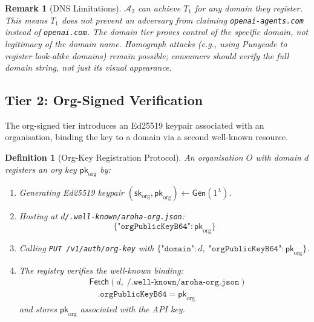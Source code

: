 \documentclass[conference]{IEEEtran}
\newtheorem{definition}{Definition}
\newtheorem{remark}{Remark}
\newcommand{\Adv}{\mathcal{A}}
\newcommand{\pk}{\mathsf{pk}}
\newcommand{\sk}{\mathsf{sk}}
\newcommand{\Gen}{\mathsf{Gen}}
\newcommand{\Fetch}{\mathsf{Fetch}}
\begin{document}
\begin{remark}[DNS Limitations]
$\Adv_2$ can achieve $T_1$ for any domain they register.
This means $T_1$ does not prevent an adversary from
claiming \texttt{openai-agents.com} instead of
\texttt{openai.com}. The domain tier proves control of the
specific domain, not legitimacy of the domain name.
Homograph attacks (e.g., using Punycode to register
look-alike domains) remain possible; consumers should
verify the full domain string, not just its visual
appearance.
\end{remark}

\subsection{Tier 2: Org-Signed Verification}

The org-signed tier introduces an Ed25519 keypair
associated with an organisation, binding the key to a
domain via a second well-known resource.

\begin{definition}[Org-Key Registration Protocol]
\label{def:org_key}
An organisation $O$ with domain $d$ registers an org key
$\pk_{\text{org}}$ by:
\begin{enumerate}
  \item Generating Ed25519 keypair $(\sk_{\text{org}},
    \pk_{\text{org}}) \leftarrow \Gen(1^\lambda)$.
  \item Hosting at $d$\texttt{/.well-known/aroha-org.json}:
    \[
      \{\texttt{"orgPublicKeyB64"}: \pk_{\text{org}}\}
    \]
  \item Calling \texttt{PUT /v1/auth/org-key} with
    $\{\texttt{"domain"}: d,\;
       \texttt{"orgPublicKeyB64"}: \pk_{\text{org}}\}$.
  \item The registry verifies the well-known binding:
    {\small\begin{align}
      &\Fetch\!\left(d,\;
         \texttt{/.well-known/aroha-org.json}\right)\nonumber\\
      &\quad\texttt{.orgPublicKeyB64} = \pk_{\text{org}}
        \label{eq:org_key_check}
    \end{align}}
    and stores $\pk_{\text{org}}$ associated with the API key.
\end{enumerate}
\end{definition}
\end{document}
